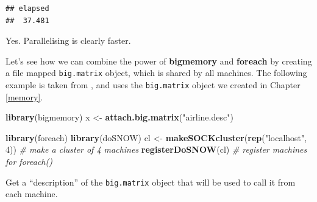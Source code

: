 \documentclass[]{book}
\newenvironment{Shaded}{\begin{snugshade}}{\end{snugshade}}
\newcommand{\KeywordTok}[1]{\textcolor[rgb]{0.13,0.29,0.53}{\textbf{#1}}}
\newcommand{\DataTypeTok}[1]{\textcolor[rgb]{0.13,0.29,0.53}{#1}}
\newcommand{\DecValTok}[1]{\textcolor[rgb]{0.00,0.00,0.81}{#1}}
\newcommand{\StringTok}[1]{\textcolor[rgb]{0.31,0.60,0.02}{#1}}
\newcommand{\CommentTok}[1]{\textcolor[rgb]{0.56,0.35,0.01}{\textit{#1}}}
\newcommand{\OtherTok}[1]{\textcolor[rgb]{0.56,0.35,0.01}{#1}}
\newcommand{\OperatorTok}[1]{\textcolor[rgb]{0.81,0.36,0.00}{\textbf{#1}}}
\newcommand{\NormalTok}[1]{#1}
\theoremstyle{definition}
\theoremstyle{definition}
\theoremstyle{definition}
\theoremstyle{remark}
\begin{document}
\begin{Shaded}
\end{Shaded}

\begin{verbatim}
## elapsed 
##  37.481
\end{verbatim}

Yes. Parallelising is clearly faster.

Let's see how we can combine the power of \textbf{bigmemory} and
\textbf{foreach} by creating a file mapped \texttt{big.matrix} object,
which is shared by all machines. The following example is taken from
\citet{kane2013scalable}, and uses the \texttt{big.matrix} object we
created in Chapter \ref{memory}.

\begin{Shaded}
\begin{Highlighting}[]
\KeywordTok{library}\NormalTok{(bigmemory)}
\NormalTok{x <-}\StringTok{ }\KeywordTok{attach.big.matrix}\NormalTok{(}\StringTok{"airline.desc"}\NormalTok{)}

\KeywordTok{library}\NormalTok{(foreach)}
\KeywordTok{library}\NormalTok{(doSNOW)}
\NormalTok{cl <-}\StringTok{ }\KeywordTok{makeSOCKcluster}\NormalTok{(}\KeywordTok{rep}\NormalTok{(}\StringTok{"localhost"}\NormalTok{, }\DecValTok{4}\NormalTok{)) }\CommentTok{# make a cluster of 4 machines}
\KeywordTok{registerDoSNOW}\NormalTok{(cl) }\CommentTok{# register machines for foreach()}
\end{Highlighting}
\end{Shaded}

Get a ``description'' of the \texttt{big.matrix} object that will be
used to call it from each machine.
\end{document}
